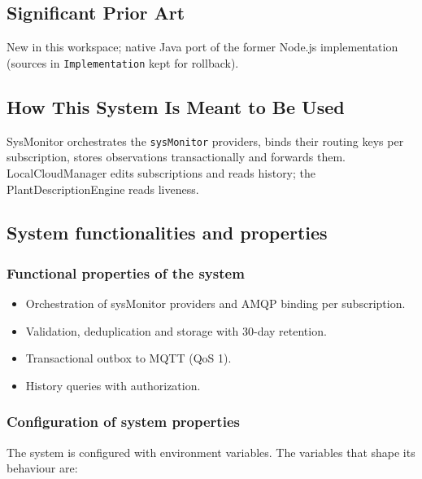 \documentclass[a4paper]{arrowhead}
\begin{document}
\newpage

\subsection{Significant Prior Art}
\label{sec:prior_art}

New in this workspace; native Java port of the former Node.js implementation (sources in \texttt{Implementation} kept for rollback).

\subsection{How This System Is Meant to Be Used}
\label{sec:use}

SysMonitor orchestrates the \texttt{sysMonitor} providers, binds their routing keys per subscription, stores observations transactionally and forwards them. LocalCloudManager edits subscriptions and reads history; the Plant\allowbreak{}Description\allowbreak{}Engine reads liveness.

\subsection{System functionalities and properties}
\label{sec:properties}

\subsubsection{Functional properties of the system}

\begin{itemize}
  \item Orchestration of sysMonitor providers and AMQP binding per subscription.
  \item Validation, deduplication and storage with 30-day retention.
  \item Transactional outbox to MQTT (QoS 1).
  \item History queries with authorization.
\end{itemize}

\subsubsection{Configuration of system properties}

The system is configured with environment variables. The variables that shape its behaviour are:
\end{document}
